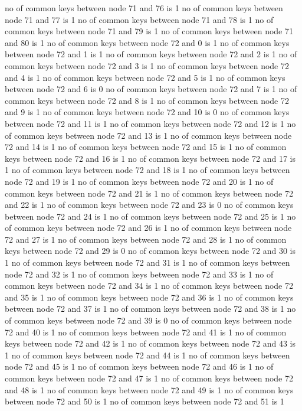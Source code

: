no of common keys between node 71 and 76 is 1
no of common keys between node 71 and 77 is 1
no of common keys between node 71 and 78 is 1
no of common keys between node 71 and 79 is 1
no of common keys between node 71 and 80 is 1
no of common keys between node 72 and 0 is 1
no of common keys between node 72 and 1 is 1
no of common keys between node 72 and 2 is 1
no of common keys between node 72 and 3 is 1
no of common keys between node 72 and 4 is 1
no of common keys between node 72 and 5 is 1
no of common keys between node 72 and 6 is 0
no of common keys between node 72 and 7 is 1
no of common keys between node 72 and 8 is 1
no of common keys between node 72 and 9 is 1
no of common keys between node 72 and 10 is 0
no of common keys between node 72 and 11 is 1
no of common keys between node 72 and 12 is 1
no of common keys between node 72 and 13 is 1
no of common keys between node 72 and 14 is 1
no of common keys between node 72 and 15 is 1
no of common keys between node 72 and 16 is 1
no of common keys between node 72 and 17 is 1
no of common keys between node 72 and 18 is 1
no of common keys between node 72 and 19 is 1
no of common keys between node 72 and 20 is 1
no of common keys between node 72 and 21 is 1
no of common keys between node 72 and 22 is 1
no of common keys between node 72 and 23 is 0
no of common keys between node 72 and 24 is 1
no of common keys between node 72 and 25 is 1
no of common keys between node 72 and 26 is 1
no of common keys between node 72 and 27 is 1
no of common keys between node 72 and 28 is 1
no of common keys between node 72 and 29 is 0
no of common keys between node 72 and 30 is 1
no of common keys between node 72 and 31 is 1
no of common keys between node 72 and 32 is 1
no of common keys between node 72 and 33 is 1
no of common keys between node 72 and 34 is 1
no of common keys between node 72 and 35 is 1
no of common keys between node 72 and 36 is 1
no of common keys between node 72 and 37 is 1
no of common keys between node 72 and 38 is 1
no of common keys between node 72 and 39 is 0
no of common keys between node 72 and 40 is 1
no of common keys between node 72 and 41 is 1
no of common keys between node 72 and 42 is 1
no of common keys between node 72 and 43 is 1
no of common keys between node 72 and 44 is 1
no of common keys between node 72 and 45 is 1
no of common keys between node 72 and 46 is 1
no of common keys between node 72 and 47 is 1
no of common keys between node 72 and 48 is 1
no of common keys between node 72 and 49 is 1
no of common keys between node 72 and 50 is 1
no of common keys between node 72 and 51 is 1

